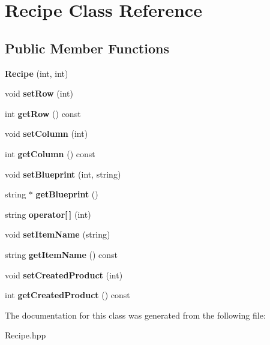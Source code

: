 \hypertarget{classRecipe}{}\section{Recipe Class Reference}
\label{classRecipe}
\subsection*{Public Member Functions}
\begin{DoxyCompactItemize}
\item 
\mbox{\label{classRecipe_aaf4b2e6b0282fa19c6381947099d25a7}} 
{\bfseries Recipe} (int, int)
\item 
\mbox{\label{classRecipe_a3e6b4889244567c3c474e3ee01d26975}} 
void {\bfseries set\+Row} (int)
\item 
\mbox{\label{classRecipe_a4c01c8c3c014f40fae53936b03dbb7e6}} 
int {\bfseries get\+Row} () const
\item 
\mbox{\label{classRecipe_aef70a9a1d8e39b5f09c9287c1fc5abb9}} 
void {\bfseries set\+Column} (int)
\item 
\mbox{\label{classRecipe_a2c965c18e26d9cb04c065b049699865f}} 
int {\bfseries get\+Column} () const
\item 
\mbox{\label{classRecipe_ad4653f2df220db08d754cc84ee987a3f}} 
void {\bfseries set\+Blueprint} (int, string)
\item 
\mbox{\label{classRecipe_a39aef1118df41ff15aa25d2fb39ab863}} 
string $\ast$ {\bfseries get\+Blueprint} ()
\item 
\mbox{\label{classRecipe_a192cd352444d58e6554a686539d364dd}} 
string {\bfseries operator\mbox{[}$\,$\mbox{]}} (int)
\item 
\mbox{\label{classRecipe_a343c41ba9e90331c361d4588113976d6}} 
void {\bfseries set\+Item\+Name} (string)
\item 
\mbox{\label{classRecipe_a6e40b01a85250263b2f971581b99175d}} 
string {\bfseries get\+Item\+Name} () const
\item 
\mbox{\label{classRecipe_af633e1415ad1b7a2d1dca9078632d1eb}} 
void {\bfseries set\+Created\+Product} (int)
\item 
\mbox{\label{classRecipe_a1490d84ae2c59de6596fe0d422ddb216}} 
int {\bfseries get\+Created\+Product} () const
\end{DoxyCompactItemize}


The documentation for this class was generated from the following file\+:\begin{DoxyCompactItemize}
\item 
Recipe.\+hpp\end{DoxyCompactItemize}
